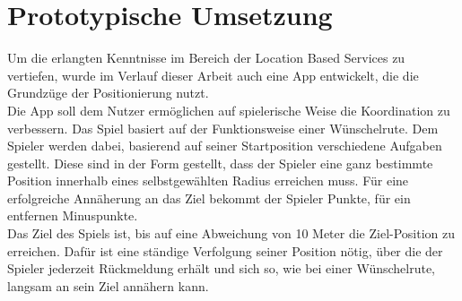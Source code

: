 \newpage
\section{Prototypische Umsetzung}
Um die erlangten Kenntnisse im Bereich der Location Based Services zu vertiefen, wurde im Verlauf dieser Arbeit auch eine App entwickelt, die die Grundzüge der Positionierung nutzt. 
\\
Die App soll dem Nutzer ermöglichen auf spielerische Weise die Koordination zu verbessern. Das Spiel basiert auf der Funktionsweise einer Wünschelrute. Dem Spieler werden dabei, basierend auf seiner Startposition verschiedene Aufgaben gestellt. Diese sind in der Form gestellt, dass der Spieler eine ganz bestimmte Position innerhalb eines selbstgewählten Radius erreichen muss. Für eine erfolgreiche Annäherung an das Ziel bekommt der Spieler Punkte, für ein entfernen Minuspunkte.
\\
Das Ziel des Spiels ist, bis auf eine Abweichung von 10 Meter die Ziel-Position zu erreichen. Dafür ist eine ständige Verfolgung seiner Position nötig, über die der Spieler jederzeit Rückmeldung erhält und sich so, wie bei einer Wünschelrute, langsam an sein Ziel annähern kann.










